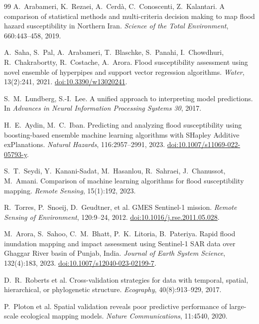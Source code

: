 \documentclass[journal]{IEEEtran}
\begin{document}
\begin{thebibliography}{99}
A.~Arabameri, K.~Rezaei, A.~Cerd\`a, C.~Conoscenti, Z.~Kalantari.
A comparison of statistical methods and multi-criteria decision making to map
flood hazard susceptibility in Northern Iran.
\emph{Science of the Total Environment}, 660:443--458, 2019.

A.~Saha, S.~Pal, A.~Arabameri, T.~Blaschke, S.~Panahi, I.~Chowdhuri,
R.~Chakrabortty, R.~Costache, A.~Arora.
Flood susceptibility assessment using novel ensemble of hyperpipes and support
vector regression algorithms.
\emph{Water}, 13(2):241, 2021.
\href{https://doi.org/10.3390/w13020241}{doi:10.3390/w13020241}.

S.~M.~Lundberg, S.-I.~Lee.
A unified approach to interpreting model predictions.
In \emph{Advances in Neural Information Processing Systems 30}, 2017.

H.~E.~Aydin, M.~C.~Iban.
Predicting and analyzing flood susceptibility using boosting-based ensemble
machine learning algorithms with SHapley Additive exPlanations.
\emph{Natural Hazards}, 116:2957--2991, 2023.
\href{https://doi.org/10.1007/s11069-022-05793-y}{doi:10.1007/s11069-022-05793-y}.

S.~T.~Seydi, Y.~Kanani-Sadat, M.~Hasanlou, R.~Sahraei, J.~Chanussot,
M.~Amani.
Comparison of machine learning algorithms for flood susceptibility mapping.
\emph{Remote Sensing}, 15(1):192, 2023.

R.~Torres, P.~Snoeij, D.~Geudtner, et al.
GMES Sentinel-1 mission.
\emph{Remote Sensing of Environment}, 120:9--24, 2012.
\href{https://doi.org/10.1016/j.rse.2011.05.028}{doi:10.1016/j.rse.2011.05.028}.

M.~Arora, S.~Sahoo, C.~M.~Bhatt, P.~K.~Litoria, B.~Pateriya.
Rapid flood inundation mapping and impact assessment using Sentinel-1 SAR data
over Ghaggar River basin of Punjab, India.
\emph{Journal of Earth System Science}, 132(4):183, 2023.
\href{https://doi.org/10.1007/s12040-023-02199-7}{doi:10.1007/s12040-023-02199-7}.

D.~R.~Roberts et al.
Cross-validation strategies for data with temporal, spatial, hierarchical, or
phylogenetic structure.
\emph{Ecography}, 40(8):913--929, 2017.

P.~Ploton et al.
Spatial validation reveals poor predictive performance of large-scale ecological
mapping models.
\emph{Nature Communications}, 11:4540, 2020.


\end{thebibliography}
\end{document}

